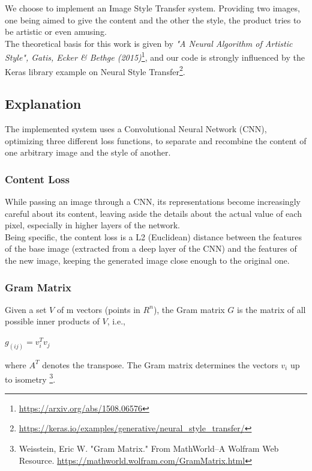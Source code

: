 We choose to implement an Image Style Transfer system.
Providing two images, one being aimed to give the content and the other the style, the product tries to be artistic or even amusing.\\
The theoretical basis for this work is given by \emph{"A Neural Algorithm of Artistic Style", Gatis, Ecker \& Bethge (2015)}\footnote{\href{https://arxiv.org/abs/1508.06576}{https://arxiv.org/abs/1508.06576}},
and our code is strongly influenced by the Keras library example on Neural Style Transfer\footnote{\href{https://keras.io/examples/generative/neural\_style\_transfer/}{https://keras.io/examples/generative/neural\_style\_transfer/}}.

\subsection{Explanation}
The implemented system uses a Convolutional Neural Network (CNN), optimizing three different loss functions, to separate and recombine the content of one arbitrary image and the style of another.
\subsubsection{Content Loss}
While passing an image through a CNN, its representations become increasingly careful about its content,
leaving aside the details about the actual value of each pixel, especially in higher layers of the network.\\
Being specific, the content loss is a L2 (Euclidean) distance between the features of the base image (extracted from a deep layer of the CNN) and the features of the new image, keeping the generated image close enough to the original one.
\subsubsection{Gram Matrix}
Given a set $V$ of m vectors (points in $R^n$), the Gram matrix $G$ is the matrix of all possible inner products of $V$, i.e.,
\begin{center}
    \(
     g_(ij)=v_i^Tv_j 
    \)
\end{center}
where \(A^T\) denotes the transpose.
The Gram matrix determines the vectors $v_i$ up to isometry
\footnote{Weisstein, Eric W. "Gram Matrix." From MathWorld--A Wolfram Web Resource. \href{https://mathworld.wolfram.com/GramMatrix.html}{https://mathworld.wolfram.com/GramMatrix.html}}.

